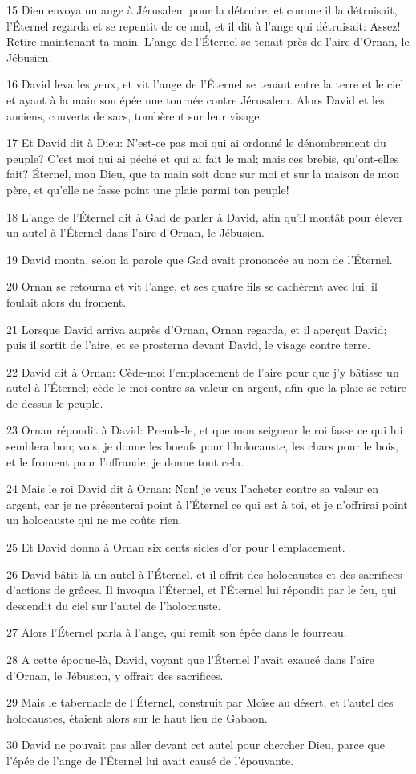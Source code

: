 \par 15 Dieu envoya un ange à Jérusalem pour la détruire; et comme il la détruisait, l'Éternel regarda et se repentit de ce mal, et il dit à l'ange qui détruisait: Assez! Retire maintenant ta main. L'ange de l'Éternel se tenait près de l'aire d'Ornan, le Jébusien.
\par 16 David leva les yeux, et vit l'ange de l'Éternel se tenant entre la terre et le ciel et ayant à la main son épée nue tournée contre Jérusalem. Alors David et les anciens, couverts de sacs, tombèrent sur leur visage.
\par 17 Et David dit à Dieu: N'est-ce pas moi qui ai ordonné le dénombrement du peuple? C'est moi qui ai péché et qui ai fait le mal; mais ces brebis, qu'ont-elles fait? Éternel, mon Dieu, que ta main soit donc sur moi et sur la maison de mon père, et qu'elle ne fasse point une plaie parmi ton peuple!
\par 18 L'ange de l'Éternel dit à Gad de parler à David, afin qu'il montât pour élever un autel à l'Éternel dans l'aire d'Ornan, le Jébusien.
\par 19 David monta, selon la parole que Gad avait prononcée au nom de l'Éternel.
\par 20 Ornan se retourna et vit l'ange, et ses quatre fils se cachèrent avec lui: il foulait alors du froment.
\par 21 Lorsque David arriva auprès d'Ornan, Ornan regarda, et il aperçut David; puis il sortit de l'aire, et se prosterna devant David, le visage contre terre.
\par 22 David dit à Ornan: Cède-moi l'emplacement de l'aire pour que j'y bâtisse un autel à l'Éternel; cède-le-moi contre sa valeur en argent, afin que la plaie se retire de dessus le peuple.
\par 23 Ornan répondit à David: Prends-le, et que mon seigneur le roi fasse ce qui lui semblera bon; vois, je donne les boeufs pour l'holocauste, les chars pour le bois, et le froment pour l'offrande, je donne tout cela.
\par 24 Mais le roi David dit à Ornan: Non! je veux l'acheter contre sa valeur en argent, car je ne présenterai point à l'Éternel ce qui est à toi, et je n'offrirai point un holocauste qui ne me coûte rien.
\par 25 Et David donna à Ornan six cents sicles d'or pour l'emplacement.
\par 26 David bâtit là un autel à l'Éternel, et il offrit des holocaustes et des sacrifices d'actions de grâces. Il invoqua l'Éternel, et l'Éternel lui répondit par le feu, qui descendit du ciel sur l'autel de l'holocauste.
\par 27 Alors l'Éternel parla à l'ange, qui remit son épée dans le fourreau.
\par 28 A cette époque-là, David, voyant que l'Éternel l'avait exaucé dans l'aire d'Ornan, le Jébusien, y offrait des sacrifices.
\par 29 Mais le tabernacle de l'Éternel, construit par Moïse au désert, et l'autel des holocaustes, étaient alors sur le haut lieu de Gabaon.
\par 30 David ne pouvait pas aller devant cet autel pour chercher Dieu, parce que l'épée de l'ange de l'Éternel lui avait causé de l'épouvante.

